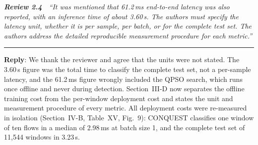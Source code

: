 \documentclass[11pt]{article}
\newcommand{\review}[2]{\par\bigskip\noindent\textbf{\textit{Review #1}}\ \ \textit{``#2''}\par\smallskip\hrule\medskip}
\newcommand{\reply}{\noindent\textbf{Reply}: }
\begin{document}
\review{2.4}{It was mentioned that 61.2\,ms end-to-end latency was also reported, with an inference time of about 3.60\,s. The authors must specify the latency unit, whether it is per sample, per batch, or for the complete test set. The authors address the detailed reproducible measurement procedure for each metric.}

\reply We thank the reviewer and agree that the units were not stated. The
3.60\,s figure was the total time to classify the complete test set, not a
per-sample latency, and the 61.2\,ms figure wrongly included the QPSO search,
which runs once offline and never during detection. Section~III-D now
separates the offline training cost from the per-window deployment cost and
states the unit and measurement procedure of every metric. All deployment
costs were re-measured in isolation (Section~IV-B, Table~XV, Fig.~9):
CONQUEST classifies one window of ten flows in a median of 2.98\,ms at batch
size 1, and the complete test set of 11{,}544 windows in 3.23\,s.
\end{document}
